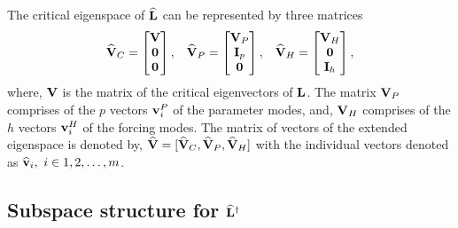 The critical eigenspace of $\mathbf{\widehat{L}}$ can be represented by three matrices
\begin{align}
	\label{eqn:extended_direct_tangent_space}
	\widehat{\mathbf{V}}_{C} = \begin{bmatrix}
		\mathbf{V} \\
		\mathbf{0} \\
		\mathbf{0}
	\end{bmatrix}, &&
	\widehat{\mathbf{V}}_{P} = \begin{bmatrix}
		\mathbf{V}_{P} \\
		\mathbf{I}_{p} \\
		\mathbf{0}
	\end{bmatrix}, &&
	\widehat{\mathbf{V}}_{H} = \begin{bmatrix}
		\mathbf{V}_{H} \\
		\mathbf{0} \\
		\mathbf{I}_{h}
	\end{bmatrix},
\end{align}
where, $\mathbf{V}$ is the matrix of the critical eigenvectors of $\mathbf{L}$. The matrix $\mathbf{V}_{P}$ comprises of the $p$ vectors $\mathbf{v}^{P}_{i}$ of the parameter modes, and, $\mathbf{V}_{H}$ comprises of the $h$ vectors $\mathbf{v}^{H}_{i}$ of the forcing modes. The matrix of vectors of the extended eigenspace is denoted by, $\widehat{\mathbf{V}} = [\widehat{\mathbf{V}}_{C}, \widehat{\mathbf{V}}_{P}, \widehat{\mathbf{V}}_{H}]$ with the individual vectors denoted as $\widehat{\mathbf{v}}_{i},\ i\in 1,2,\ldots,m$. 

\subsection{Subspace structure for $\mathbf{\widehat{L}}^{\dagger}$}

